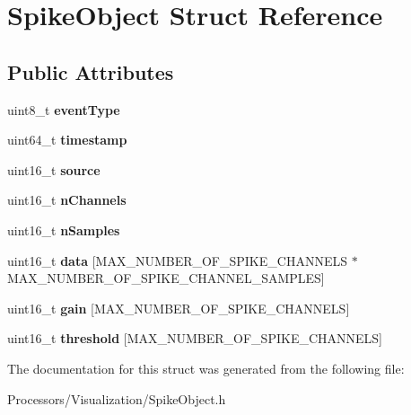 \hypertarget{structSpikeObject}{\section{Spike\-Object Struct Reference}
\label{structSpikeObject}
}
\subsection*{Public Attributes}
\begin{DoxyCompactItemize}
\item 
\hypertarget{structSpikeObject_a89a9d28a3f76e004c5434ab87a13f6ce}{uint8\-\_\-t {\bfseries event\-Type}}\label{structSpikeObject_a89a9d28a3f76e004c5434ab87a13f6ce}

\item 
\hypertarget{structSpikeObject_ad9b485d97938e01e1e8ed5044d26aaf5}{uint64\-\_\-t {\bfseries timestamp}}\label{structSpikeObject_ad9b485d97938e01e1e8ed5044d26aaf5}

\item 
\hypertarget{structSpikeObject_ad82d2c52cd9262794947807cc70f0bc8}{uint16\-\_\-t {\bfseries source}}\label{structSpikeObject_ad82d2c52cd9262794947807cc70f0bc8}

\item 
\hypertarget{structSpikeObject_a126c96ef75bce81f86e45ed6559f16f0}{uint16\-\_\-t {\bfseries n\-Channels}}\label{structSpikeObject_a126c96ef75bce81f86e45ed6559f16f0}

\item 
\hypertarget{structSpikeObject_addde0b7ca60cad4b48e8def822eee034}{uint16\-\_\-t {\bfseries n\-Samples}}\label{structSpikeObject_addde0b7ca60cad4b48e8def822eee034}

\item 
\hypertarget{structSpikeObject_ab64109049bbe27ddbf44fa7441698103}{uint16\-\_\-t {\bfseries data} \mbox{[}M\-A\-X\-\_\-\-N\-U\-M\-B\-E\-R\-\_\-\-O\-F\-\_\-\-S\-P\-I\-K\-E\-\_\-\-C\-H\-A\-N\-N\-E\-L\-S $\ast$M\-A\-X\-\_\-\-N\-U\-M\-B\-E\-R\-\_\-\-O\-F\-\_\-\-S\-P\-I\-K\-E\-\_\-\-C\-H\-A\-N\-N\-E\-L\-\_\-\-S\-A\-M\-P\-L\-E\-S\mbox{]}}\label{structSpikeObject_ab64109049bbe27ddbf44fa7441698103}

\item 
\hypertarget{structSpikeObject_aeb26d8b44806e5d80ee785e28db122ce}{uint16\-\_\-t {\bfseries gain} \mbox{[}M\-A\-X\-\_\-\-N\-U\-M\-B\-E\-R\-\_\-\-O\-F\-\_\-\-S\-P\-I\-K\-E\-\_\-\-C\-H\-A\-N\-N\-E\-L\-S\mbox{]}}\label{structSpikeObject_aeb26d8b44806e5d80ee785e28db122ce}

\item 
\hypertarget{structSpikeObject_aa3b4cec4bcc9b1e1ad0f50d8babead63}{uint16\-\_\-t {\bfseries threshold} \mbox{[}M\-A\-X\-\_\-\-N\-U\-M\-B\-E\-R\-\_\-\-O\-F\-\_\-\-S\-P\-I\-K\-E\-\_\-\-C\-H\-A\-N\-N\-E\-L\-S\mbox{]}}\label{structSpikeObject_aa3b4cec4bcc9b1e1ad0f50d8babead63}

\end{DoxyCompactItemize}


The documentation for this struct was generated from the following file\-:\begin{DoxyCompactItemize}
\item 
Processors/\-Visualization/Spike\-Object.\-h\end{DoxyCompactItemize}

